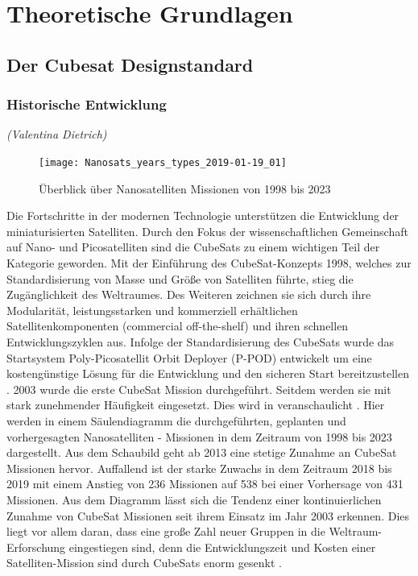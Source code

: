 \chapter{Theoretische Grundlagen}\label{theorie}
\section{Der Cubesat Designstandard}%
	\subsection{Historische Entwicklung}
	\hfill\emph{(Valentina Dietrich)}\\
				\begin{figure}[H]
				\centering
					\texttt{[image: Nanosats\_years\_types\_2019-01-19\_01]}
				\caption{Überblick über Nanosatelliten Missionen von 1998 bis 2023 \cite{ErikKulu.2019}}
				\label{fig:NanosatsTypes}
			\end{figure}Die Fortschritte in der modernen Technologie unterstützen die Entwicklung der miniaturisierten Satelliten. Durch den Fokus der wissenschaftlichen Gemeinschaft auf Nano- und Picosatelliten sind die CubeSats zu einem wichtigen Teil der Kategorie geworden. Mit der Einführung des CubeSat-Konzepts 1998, welches zur Standardisierung von Masse und Größe von Satelliten führte, stieg die Zugänglichkeit des Weltraumes. Des Weiteren zeichnen sie sich durch ihre Modularität, leistungsstarken und kommerziell erhältlichen Satellitenkomponenten (commercial off-the-shelf) und ihren schnellen Entwicklungszyklen aus. Infolge der Standardisierung des CubeSats wurde das Startsystem Poly-Picosatellit Orbit Deployer (P-POD) entwickelt um eine kostengünstige Lösung für die Entwicklung und den sicheren Start bereitzustellen \cite[S. 1 - 4]{RahmatSamii.2017}. 2003 wurde die erste CubeSat Mission durchgeführt. Seitdem werden sie mit stark zunehmender Häufigkeit eingesetzt. Dies wird in  veranschaulicht \cite[S. 1]{firstone}.  Hier werden in einem Säulendiagramm die durchgeführten, geplanten und vorhergesagten Nanosatelliten - Missionen in dem Zeitraum von 1998 bis 2023 dargestellt. Aus dem Schaubild geht ab 2013 eine stetige Zunahme an CubeSat Missionen hervor. Auffallend ist der starke Zuwachs in dem Zeitraum 2018 bis 2019 mit einem Anstieg von  \num{236} Missionen auf \num{538} bei einer Vorhersage von \num{431} Missionen. Aus dem Diagramm lässt sich die Tendenz einer kontinuierlichen Zunahme von CubeSat Missionen seit ihrem Einsatz im Jahr 2003 erkennen. Dies liegt vor allem daran, dass eine große Zahl neuer Gruppen in die Weltraum-Erforschung eingestiegen sind, denn die Entwicklungszeit und Kosten einer Satelliten-Mission sind durch CubeSats enorm gesenkt \cite[S. 1 - 4]{RahmatSamii.2017}.
	
